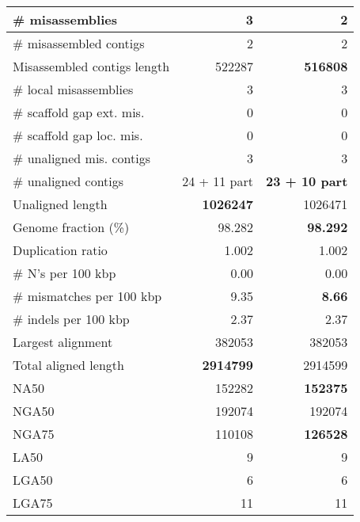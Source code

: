 \documentclass[12pt,a4paper]{article}
\begin{document}
\begin{table}[ht]
\begin{center}
\begin{tabular}{|l*{2}{|r}|}
\# misassemblies & 3 & {\bf 2} \\ \hline
\# misassembled contigs & 2 & 2 \\ \hline
Misassembled contigs length & 522287 & {\bf 516808} \\ \hline
\# local misassemblies & 3 & 3 \\ \hline
\# scaffold gap ext. mis. & 0 & 0 \\ \hline
\# scaffold gap loc. mis. & 0 & 0 \\ \hline
\# unaligned mis. contigs & 3 & 3 \\ \hline
\# unaligned contigs & 24 + 11 part & {\bf 23 + 10 part} \\ \hline
Unaligned length & {\bf 1026247} & 1026471 \\ \hline
Genome fraction (\%) & 98.282 & {\bf 98.292} \\ \hline
Duplication ratio & 1.002 & 1.002 \\ \hline
\# N's per 100 kbp & 0.00 & 0.00 \\ \hline
\# mismatches per 100 kbp & 9.35 & {\bf 8.66} \\ \hline
\# indels per 100 kbp & 2.37 & 2.37 \\ \hline
Largest alignment & 382053 & 382053 \\ \hline
Total aligned length & {\bf 2914799} & 2914599 \\ \hline
NA50 & 152282 & {\bf 152375} \\ \hline
NGA50 & 192074 & 192074 \\ \hline
NGA75 & 110108 & {\bf 126528} \\ \hline
LA50 & 9 & 9 \\ \hline
LGA50 & 6 & 6 \\ \hline
LGA75 & 11 & 11 \\ \hline
\end{tabular}
\end{center}
\end{table}
\end{document}
